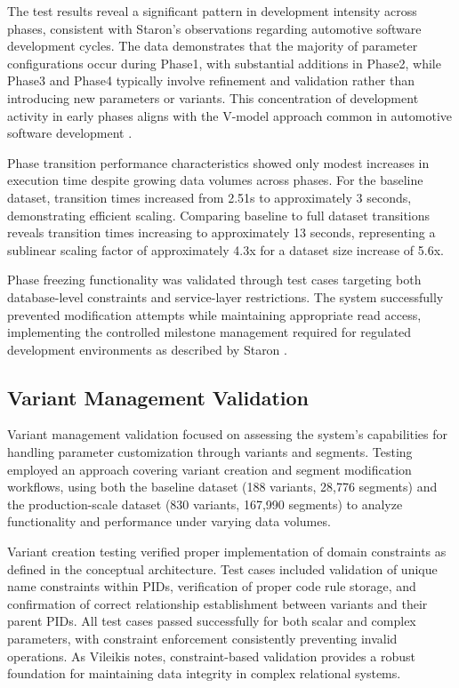 The test results reveal a significant pattern in development intensity across phases, consistent with Staron's observations \cite{staron2021automotive} regarding automotive software development cycles. The data demonstrates that the majority of parameter configurations occur during Phase1, with substantial additions in Phase2, while Phase3 and Phase4 typically involve refinement and validation rather than introducing new parameters or variants. This concentration of development activity in early phases aligns with the V-model approach common in automotive software development \cite{pretschner2007software}.

Phase transition performance characteristics showed only modest increases in execution time despite growing data volumes across phases. For the baseline dataset, transition times increased from 2.51s to approximately 3 seconds, demonstrating efficient scaling. Comparing baseline to full dataset transitions reveals transition times increasing to approximately 13 seconds, representing a sublinear scaling factor of approximately 4.3x for a dataset size increase of 5.6x.

Phase freezing functionality was validated through test cases targeting both database-level constraints and service-layer restrictions. The system successfully prevented modification attempts while maintaining appropriate read access, implementing the controlled milestone management required for regulated development environments as described by Staron \cite{staron2021automotive}.

\subsection{Variant Management Validation}
\label{subsec:variant-management-validation}

Variant management validation focused on assessing the system's capabilities for handling parameter customization through variants and segments. Testing employed an approach covering variant creation and segment modification workflows, using both the baseline dataset (188 variants, 28,776 segments) and the production-scale dataset (830 variants, 167,990 segments) to analyze functionality and performance under varying data volumes.

Variant creation testing verified proper implementation of domain constraints as defined in the conceptual architecture. Test cases included validation of unique name constraints within \acp{PID}, verification of proper code rule storage, and confirmation of correct relationship establishment between variants and their parent \acp{PID}. All test cases passed successfully for both scalar and complex parameters, with constraint enforcement consistently preventing invalid operations. As Vileikis \cite{vileikishacking} notes, constraint-based validation provides a robust foundation for maintaining data integrity in complex relational systems.

